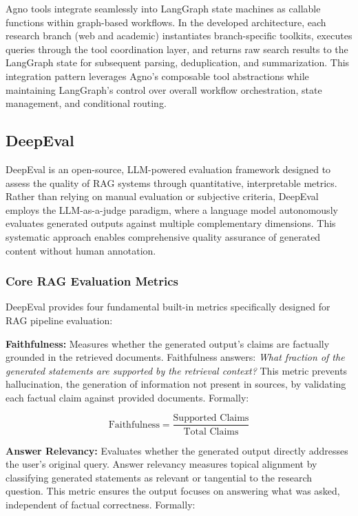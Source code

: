 Agno tools integrate seamlessly into LangGraph state machines as callable functions within graph-based workflows. In the developed architecture, each research branch (web and academic) instantiates branch-specific toolkits, executes queries through the tool coordination layer, and returns raw search results to the LangGraph state for subsequent parsing, deduplication, and summarization. This integration pattern leverages Agno's composable tool abstractions while maintaining LangGraph's control over overall workflow orchestration, state management, and conditional routing.




\subsection{DeepEval}

DeepEval is an open-source, LLM-powered evaluation framework designed to assess the quality of RAG systems through quantitative, interpretable metrics. Rather than relying on manual evaluation or subjective criteria, DeepEval employs the LLM-as-a-judge paradigm, where a language model autonomously evaluates generated outputs against multiple complementary dimensions. This systematic approach enables comprehensive quality assurance of generated content without human annotation.

\subsubsection{Core RAG Evaluation Metrics}

DeepEval provides four fundamental built-in metrics specifically designed for RAG pipeline evaluation:

\textbf{Faithfulness:} Measures whether the generated output's claims are factually grounded in the retrieved documents. Faithfulness answers: \textit{What fraction of the generated statements are supported by the retrieval context?} This metric prevents hallucination, the generation of information not present in sources, by validating each factual claim against provided documents. Formally:

\begin{equation}
\text{Faithfulness} = \frac{\text{Supported Claims}}{\text{Total Claims}}
\end{equation}

\textbf{Answer Relevancy:} Evaluates whether the generated output directly addresses the user's original query. Answer relevancy measures topical alignment by classifying generated statements as relevant or tangential to the research question. This metric ensures the output focuses on answering what was asked, independent of factual correctness. Formally:

